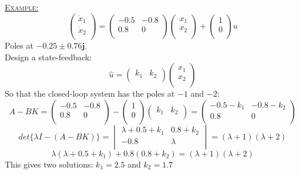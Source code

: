 \documentclass[12pt,a4paper]{article}
\begin{document}
\begin{tcolorbox}[breakable]
\underline{\textsc{Example:}}
\begin{equation*}
\begin{pmatrix}
\dot{x}_{1}\\
\dot{x}_{2}\\
\end{pmatrix} = 
\begin{pmatrix}
-0.5&-0.8\\
0.8&0\\
\end{pmatrix}
\begin{pmatrix}
x_{1}\\
x_{2}\\
\end{pmatrix}
+\begin{pmatrix}
1\\
0\\
\end{pmatrix}
u
\end{equation*}
Poles at $-0.25\pm 0.76\mathbf{j}$.\ \\
Design a state-feedback:
\begin{equation*}
\hat{u} = \begin{pmatrix}
k_{1} & k_{2}\\
\end{pmatrix}
\begin{pmatrix}
x_{1}\\
x_{2}\\
\end{pmatrix}
\end{equation*}
So that the closed-loop system has the poles at $-1$ and $-2$:
\begin{equation*}
A-BK = \begin{pmatrix}
-0.5&-0.8\\
0.8&0\\
\end{pmatrix}-
\begin{pmatrix}
1\\
0\\
\end{pmatrix}
\begin{pmatrix} 
k_{1}&k_{2}\\
\end{pmatrix}
 = 
 \begin{pmatrix}
 -0.5-k_{1}&-0.8-k_{2}\\
 0.8&0\\
 \end{pmatrix}
\end{equation*}
\begin{equation*}
det\{\lambda I-(A-BK)\} = \begin{vmatrix}
\lambda+0.5+k_{1} & 0.8+k_{2}\\
-0.8&\lambda\\
\end{vmatrix}
= (\lambda +1)(\lambda +2) 
\end{equation*}
\[ \lambda(\lambda + 0.5 + k_{1}) + 0.8(0.8 + k_{2}) = (\lambda +1)(\lambda +2) \]
This gives two solutions: $k_{1}=2.5$ and $k_{2}=1.7$
\end{tcolorbox}
\end{document}
